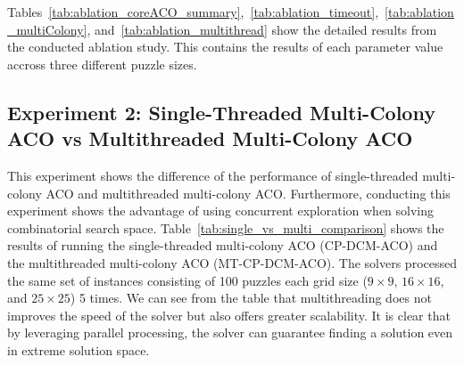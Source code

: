        Tables~\ref{tab:ablation_coreACO_summary},~\ref{tab:ablation_timeout},~\ref{tab:ablation_multiColony}, and~\ref{tab:ablation_multithread} show the detailed results from the conducted ablation study. This contains the results of each parameter value accross three different puzzle sizes. 

\subsection{Experiment 2: Single-Threaded Multi-Colony ACO vs Multithreaded Multi-Colony ACO} 
        This experiment shows the difference of the performance of single-threaded multi-colony ACO and multithreaded multi-colony ACO. Furthermore, conducting this experiment shows the advantage of using concurrent exploration when solving combinatorial search space. 
        Table~\ref{tab:single_vs_multi_comparison} shows the results of running the single-threaded multi-colony ACO (CP-DCM-ACO) and the multithreaded multi-colony ACO (MT-CP-DCM-ACO). The solvers processed the same set of instances consisting of 100 puzzles each grid size ($9\times9$, $16\times16$, and $25\times25$) 5 times. We can see from the table that multithreading does not improves the speed of the solver but also offers greater scalability. It is clear that by leveraging parallel processing, the solver can guarantee finding a solution even in extreme solution space. 

